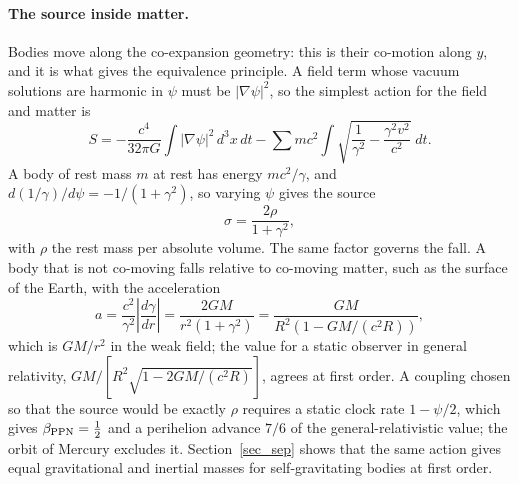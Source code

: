 \documentclass{iopjournal}
\begin{document}
\paragraph{The source inside matter.} Bodies move along the co-expansion geometry: this is their co-motion along $y$, and it is what gives the equivalence principle. A field term whose vacuum solutions are harmonic in $\psi$ must be $|\nabla\psi|^2$, so the simplest action for the field and matter is
\begin{equation}\label{eq_action}
    S=-\frac{c^4}{32\pi G}\int|\nabla\psi|^2\,d^3x\,dt-\sum m c^2\int\sqrt{\frac{1}{\gamma^2}-\frac{\gamma^2v^2}{c^2}}\;dt .
\end{equation}
A body of rest mass $m$ at rest has energy $mc^2/\gamma$, and $d(1/\gamma)/d\psi=-1/(1+\gamma^2)$, so varying $\psi$ gives the source
\begin{equation}\label{eq_source_coexp}
    \sigma=\frac{2\rho}{1+\gamma^2},
\end{equation}
with $\rho$ the rest mass per absolute volume. The same factor governs the fall. A body that is not co-moving falls relative to co-moving matter, such as the surface of the Earth, with the acceleration
\begin{equation}\label{eq_fall}
    a=\frac{c^2}{\gamma^2}\left|\frac{d\gamma}{dr}\right|=\frac{2GM}{r^2(1+\gamma^2)}=\frac{GM}{R^2\left(1-GM/(c^2R)\right)},
\end{equation}
which is $GM/r^2$ in the weak field; the value for a static observer in general relativity, $GM/[R^2\sqrt{1-2GM/(c^2R)}]$, agrees at first order. A coupling chosen so that the source would be exactly $\rho$ requires a static clock rate $1-\psi/2$, which gives $\beta_{\rm PPN}=\tfrac12$ and a perihelion advance $7/6$ of the general-relativistic value; the orbit of Mercury excludes it. Section~\ref{sec_sep} shows that the same action gives equal gravitational and inertial masses for self-gravitating bodies at first order.
\end{document}
